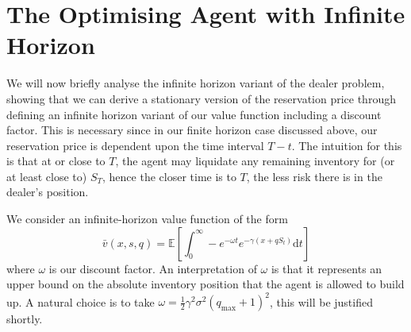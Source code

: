 \section{The Optimising Agent with Infinite Horizon}\label{sec:3.4}
We will now briefly analyse the infinite horizon variant of the dealer problem, showing
that we can derive a stationary version of the reservation price through defining
an infinite horizon variant of our value function including a discount factor. This is
necessary since in our finite horizon case discussed above, our reservation price is
dependent upon the time interval $T-t.$ The intuition for this is that at or close to 
$T$, the agent may liquidate any remaining inventory for (or at least close to) $S_T$,
hence the closer time is to $T$, the less risk there is in the dealer's position.

We consider an infinite-horizon value function of the form
\begin{equation*}
    \bar v(x,s,q)=\mathbb{E}\left[\int_{0}^{\infty}-e^{-\omega t}e^{-\gamma(x+qS_t)}\mathrm dt\right]
\end{equation*}
where $\omega$ is our discount factor. An interpretation of $\omega$ is that it
represents an upper bound on the absolute inventory position that the agent is allowed
to build up. A natural choice is to take $\omega=\frac{1}{2}\gamma^2\sigma^2(q_{\textrm{max}}+1)^2$, 
this will be justified shortly. 

